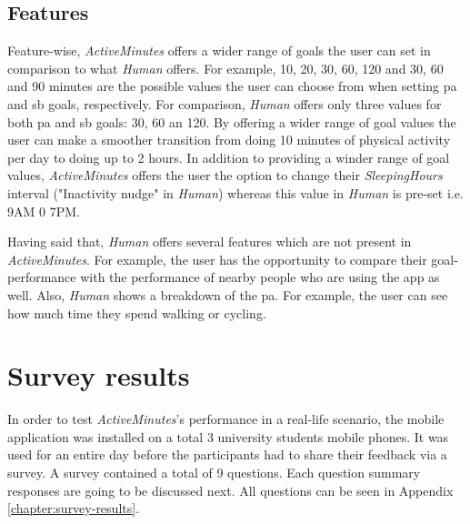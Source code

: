 \subsection{Features}
Feature-wise, \textit{ActiveMinutes} offers a wider range of goals the user can set in comparison to what \textit{Human} offers. For example, 10, 20, 30, 60, 120 and 30, 60 and 90 minutes are the possible values the user can choose from when setting \gls{pa} and \gls{sb} goals, respectively. For comparison, \textit{Human} offers only three values for both \gls{pa} and \gls{sb} goals: 30, 60 an 120. By offering a wider range of goal values the user can make a smoother transition from doing 10 minutes of physical activity per day to doing up to 2 hours. In addition to providing a winder range of goal values, \textit{ActiveMinutes} offers the user the option to change their \textit{SleepingHours} interval ("Inactivity nudge" in \textit{Human}) whereas this value in \textit{Human} is pre-set i.e. 9AM 0 7PM.

Having said that, \textit{Human} offers several features which are not present in \textit{ActiveMinutes}. For example, the user has the opportunity to compare their goal-performance with the performance of nearby people who are using the app as well. Also, \textit{Human} shows a breakdown of the \gls{pa}. For example, the user can see how much time they spend walking or cycling. 

\section{Survey results}
In order to test \textit{ActiveMinutes}'s performance in a real-life scenario, the mobile application was installed on a total 3 university students mobile phones. It was used for an entire day before the participants had to share their feedback via a survey. A survey contained a total of 9 questions. Each question summary responses are going to be discussed next. All questions can be seen in Appendix \ref{chapter:survey-results}.

